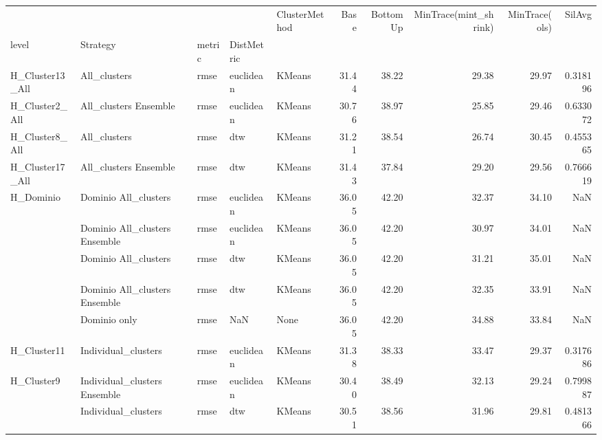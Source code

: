 \begin{tabular}{lllllrrrrr}
\toprule
          &                                &      &     & ClusterMethod &   Base &  BottomUp &  MinTrace(mint\_shrink) &  MinTrace(ols) &    SilAvg \\
level & Strategy & metric & DistMetric &               &        &           &                        &                &           \\
\midrule
H\_Cluster13\_All & All\_clusters & rmse & euclidean &        KMeans &  31.44 &     38.22 &                  29.38 &          29.97 &  0.318196 \\
H\_Cluster2\_All & All\_clusters Ensemble & rmse & euclidean &        KMeans &  30.76 &     38.97 &                  25.85 &          29.46 &  0.633072 \\
H\_Cluster8\_All & All\_clusters & rmse & dtw &        KMeans &  31.21 &     38.54 &                  26.74 &          30.45 &  0.455365 \\
H\_Cluster17\_All & All\_clusters Ensemble & rmse & dtw &        KMeans &  31.43 &     37.84 &                  29.20 &          29.56 &  0.766619 \\
H\_Dominio & Dominio All\_clusters & rmse & euclidean &        KMeans &  36.05 &     42.20 &                  32.37 &          34.10 &       NaN \\
          & Dominio All\_clusters Ensemble & rmse & euclidean &        KMeans &  36.05 &     42.20 &                  30.97 &          34.01 &       NaN \\
          & Dominio All\_clusters & rmse & dtw &        KMeans &  36.05 &     42.20 &                  31.21 &          35.01 &       NaN \\
          & Dominio All\_clusters Ensemble & rmse & dtw &        KMeans &  36.05 &     42.20 &                  32.35 &          33.91 &       NaN \\
          & Dominio only & rmse & NaN &          None &  36.05 &     42.20 &                  34.88 &          33.84 &       NaN \\
H\_Cluster11 & Individual\_clusters & rmse & euclidean &        KMeans &  31.38 &     38.33 &                  33.47 &          29.37 &  0.317686 \\
H\_Cluster9 & Individual\_clusters Ensemble & rmse & euclidean &        KMeans &  30.40 &     38.49 &                  32.13 &          29.24 &  0.799887 \\
          & Individual\_clusters & rmse & dtw &        KMeans &  30.51 &     38.56 &                  31.96 &          29.81 &  0.481366 \\

\end{tabular}
